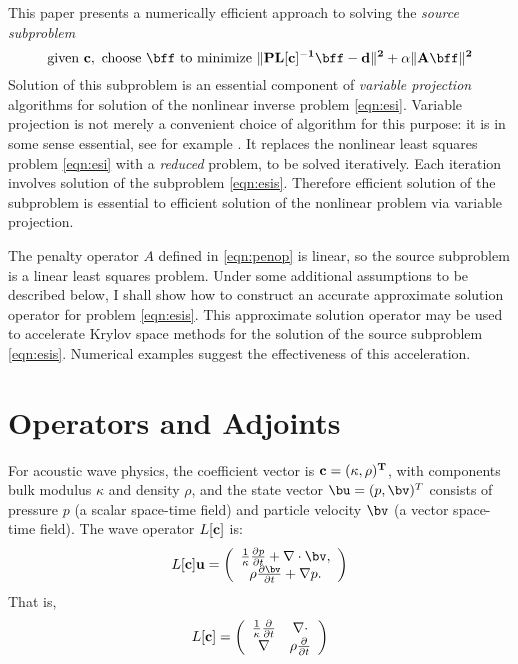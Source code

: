 This paper presents a numerically efficient approach to solving the {\em source subproblem}
\begin{equation}
\label{eqn:esis}
\mbox{given } \bf{c}, \mbox{ choose } \bff \mbox{ to minimize } \|PL[\bf{c}]^{-1}\bff -d \|^2 + \alpha \|A\bff\|^2 
\end{equation}
Solution of this subproblem is an essential component of {\em variable
  projection} algorithms for solution of the nonlinear inverse problem
\ref{eqn:esi}. Variable projection is not merely a convenient choice
of algorithm for this purpose: it is in some sense essential, see for
example \cite{Symes:SEG20}. It replaces the nonlinear
least squares problem \ref{eqn:esi} with a {\em reduced} problem, to
be solved iteratively. Each iteration involves solution of the
subproblem \ref{eqn:esis}. Therefore efficient solution of the
subproblem is essential to efficient solution of the nonlinear problem
via variable projection.

The penalty operator $A$ defined in \ref{eqn:penop} is linear, so the source
subproblem is a linear least squares problem. Under some additional
assumptions to be described below, I shall show how to construct an
accurate approximate solution operator for problem
\ref{eqn:esis}. This approximate solution operator may be used to
accelerate Krylov space methods for the solution of the source
subproblem \ref{eqn:esis}. Numerical examples suggest the
effectiveness of this acceleration.

\section{Operators and Adjoints}

For acoustic wave physics, the coefficient vector is
$\bf{c}=(\kappa,\rho)^T$, with components bulk modulus $\kappa$ and
density $\rho$, and the state vector $\bu=(p,\bv)^T$ consists of
pressure $p$ (a scalar space-time field) and particle velocity $\bv$
(a vector space-time field). The wave operator $L[\bf{c}]$ is:
\begin{equation}
\label{eqn:aweop}
L[\bf{c}]\bf{u} = 
\left(
\begin{array}{c}
\frac{1}{\kappa}\frac{\partial p}{\partial t}  + \nabla \cdot \bv, \\
\rho\frac{\partial \bv}{\partial t} + \nabla p.
\end{array}
\right) 
\end{equation}
That is,
\begin{equation}
  \label{eqn:awemat}
  L[\bf{c}] = \left(
    \begin{array}{cc}
      \frac{1}{\kappa}\frac{\partial}{\partial t} & \nabla \cdot \\
      \nabla & \rho \frac{\partial}{\partial t}
    \end{array}
  \right)
\end{equation}

